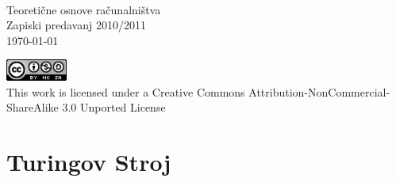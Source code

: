 \documentclass[10pt,a4paper,oneside]{book}
\begin{document}
\begin{titlepage}
\begin{center}
\ \\[8cm]
{\Huge Teoretične osnove računalništva}\\[5pt]
{\LARGE Zapiski predavanj 2010/2011}\\[15pt]
{\large \today}
\vfill

\parbox{7.5cm}{
\begin{center}
\includegraphics[width=0.15\textwidth]{./CC}\\[5pt]

This work is licensed under a Creative Commons Attribution-NonCommercial-ShareAlike 3.0 Unported License
\end{center}
}
\end{center}
\end{titlepage}
\tableofcontents
\pagebreak
\chapter{Turingov Stroj}
\end{document}
